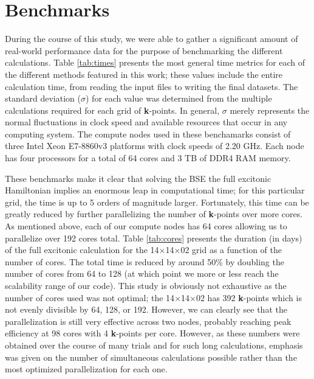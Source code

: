 \documentclass[aps,prb,10pt,superscriptaddress,notitlepage,endfloats]{revtex4-1}
\begin{document}

\section{Benchmarks}\label{sec:bench}

During the course of this study, we were able to gather a significant amount of
real-world performance data for the purpose of benchmarking the different
calculations. Table \ref{tab:times} presents the most general time metrics for
each of the different methods featured in this work; these values include the
entire calculation time, from reading the input files to writing the final
datasets. The standard deviation ($\sigma$) for each value was determined from
the multiple calculations required for each grid of \textbf{k}-points. In
general, $\sigma$ merely represents the normal fluctuations in clock speed and
available resources that occur in any computing system. The compute nodes used
in these benchamarks consist of three Intel Xeon E7-8860v3 platforms with clock
speeds of 2.20 GHz. Each node has four processors for a total of 64 cores and 3
TB of DDR4 RAM memory.

These benchmarks make it clear that solving the BSE the full excitonic
Hamiltonian implies an enormous leap in computational time; for this particular
grid, the time is up to 5 orders of magnitude larger. Fortunately, this time can
be greatly reduced by further parallelizing the number of \textbf{k}-points over
more cores. As mentioned above, each of our compute nodes has 64 cores allowing
us to parallelize over 192 cores total. Table \ref{tab:cores} presents the
duration (in days) of the full excitonic calculation for the
14$\times$14$\times$02 grid as a function of the number of cores. The total time
is reduced by around 50\% by doubling the number of cores from 64 to 128 (at
which point we more or less reach the scalability range of our code). This study
is obviously not exhaustive as the number of cores used was not optimal; the
14$\times$14$\times$02 has 392 \textbf{k}-points which is not evenly divisible
by 64, 128, or 192. However, we can clearly see that the parallelization is
still very effective across two nodes, probably reaching peak efficiency at 98
cores with 4 \textbf{k}-points per core. However, as these numbers were obtained
over the course of many trials and for such long calculations, emphasis was
given on the number of simultaneous calculations possible rather than the most
optimized parallelization for each one.
\end{document}
